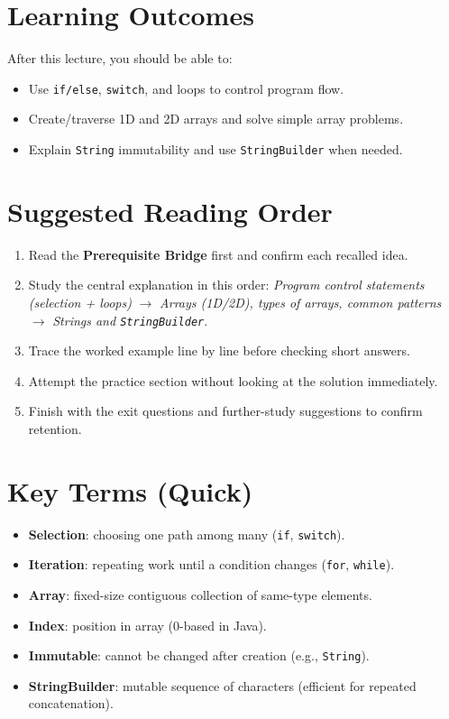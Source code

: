 \documentclass[11pt]{article}
\begin{document}
\section{Learning Outcomes}
After this lecture, you should be able to:
\begin{itemize}
  \item Use \texttt{if/else}, \texttt{switch}, and loops to control program flow.
  \item Create/traverse 1D and 2D arrays and solve simple array problems.
  \item Explain \texttt{String} immutability and use \texttt{StringBuilder} when needed.
\end{itemize}

\section{Suggested Reading Order}
\begin{enumerate}
  \item Read the \textbf{Prerequisite Bridge} first and confirm each recalled idea.
  \item Study the central explanation in this order: \textit{Program control statements (selection + loops)} $\rightarrow$ \textit{Arrays (1D/2D), types of arrays, common patterns} $\rightarrow$ \textit{Strings and \texttt{StringBuilder}}.
  \item Trace the worked example line by line before checking short answers.
  \item Attempt the practice section without looking at the solution immediately.
  \item Finish with the exit questions and further-study suggestions to confirm retention.
\end{enumerate}
\notesources{\OOPSUnitISources}

\section{Key Terms (Quick)}
\begin{itemize}
  \item \textbf{Selection}: choosing one path among many (\texttt{if}, \texttt{switch}).
  \item \textbf{Iteration}: repeating work until a condition changes (\texttt{for}, \texttt{while}).
  \item \textbf{Array}: fixed-size contiguous collection of same-type elements.
  \item \textbf{Index}: position in array (0-based in Java).
  \item \textbf{Immutable}: cannot be changed after creation (e.g., \texttt{String}).
  \item \textbf{StringBuilder}: mutable sequence of characters (efficient for repeated concatenation).
\end{itemize}
\end{document}
